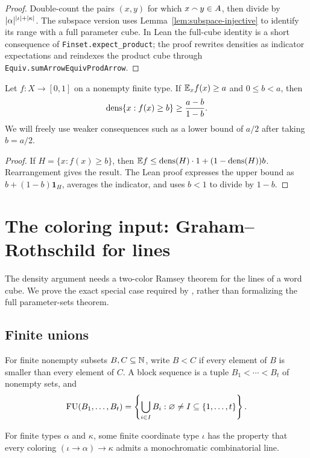 \begin{proof}
Double-count the pairs $(x,y)$ for which $x\mathbin{\smallfrown} y\in A$, then divide by
$\lvert \alpha\rvert^{\lvert \iota\rvert+\lvert \kappa\rvert}$.  The subspace version uses
Lemma~\ref{lem:subspace-injective} to identify its range with a full parameter cube.
In Lean the full-cube identity is a short consequence of \texttt{Finset.expect\_product}; the
proof rewrites densities as indicator expectations and reindexes the product cube through
\texttt{Equiv.sumArrowEquivProdArrow}.
\end{proof}

\begin{lemma}
\label{lem:threshold-average}
Let $f:X\to[0,1]$ on a nonempty finite type.  If $\mathbb{E}_x f(x)\geq a$ and
$0\leq b<a$, then
\[
 \operatorname{dens}\{x:f(x)\geq b\}\geq\frac{a-b}{1-b}.
\]
We will freely use weaker consequences such as a lower bound of $a/2$ after taking $b=a/2$.
\end{lemma}

\begin{proof}
If $H=\{x:f(x)\geq b\}$, then
$\mathbb{E} f\leq\operatorname{dens}(H)\cdot1+(1-\operatorname{dens}(H))b$.  Rearrangement gives the result.
The Lean proof expresses the upper bound as $b+(1-b)\mathbf 1_H$, averages the indicator, and
uses $b<1$ to divide by $1-b$.
\end{proof}


\chapter{The coloring input: Graham--Rothschild for lines}
\label{chap:gr}

The density argument needs a two-color Ramsey theorem for the lines of a word cube.  We prove the
exact special case required by \cite{DKT}, rather than formalizing the full parameter-sets theorem.

\section{Finite unions}

For finite nonempty subsets $B,C\subseteq\mathbb{N}$, write $B<C$ if every element of $B$ is smaller than
every element of $C$.  A block sequence is a tuple $B_1<\cdots<B_t$ of nonempty sets, and
\[
  \operatorname{FU}(B_1,\ldots,B_t)
  =\left\{\bigcup_{i\in I}B_i:\varnothing\neq I\subseteq\{1,\ldots,t\}\right\}.
\]

\begin{theorem}
\label{thm:color-hj}
\mathlibok
For finite types $\alpha$ and $\kappa$, some finite coordinate type $\iota$ has the property that
every coloring $(\iota\to\alpha)\to\kappa$ admits a monochromatic combinatorial line.
\end{theorem}


